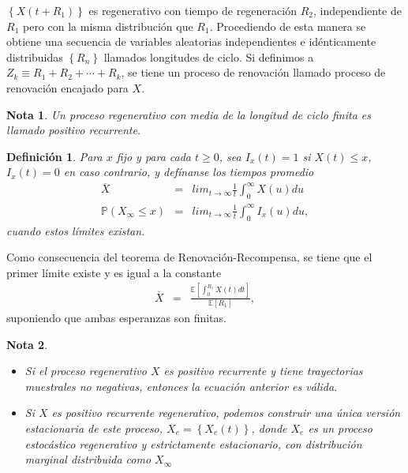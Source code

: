 \documentclass{article}
\newtheorem{Def}{Definición}
\newtheorem{Note}{Nota}
\newcommand{\esp}{\mathbb{E}}
\newcommand{\prob}{\mathbb{P}}
\begin{document}
$\left\{X\left(t+R_{1}\right)\right\}$ es regenerativo con tiempo de regeneraci\'on $R_{2}$, independiente de $R_{1}$ pero con la misma distribuci\'on que $R_{1}$. Procediendo de esta manera se obtiene una secuencia de variables aleatorias independientes e id\'enticamente distribuidas $\left\{R_{n}\right\}$ llamados longitudes de ciclo. Si definimos a $Z_{k}\equiv R_{1}+R_{2}+\cdots+R_{k}$, se tiene un proceso de renovaci\'on llamado proceso de renovaci\'on encajado para $X$.

\begin{Note}
Un proceso regenerativo con media de la longitud de ciclo finita es llamado positivo recurrente.
\end{Note}


\begin{Def}
Para $x$ fijo y para cada $t\geq0$, sea $I_{x}\left(t\right)=1$ si $X\left(t\right)\leq x$,  $I_{x}\left(t\right)=0$ en caso contrario, y def\'inanse los tiempos promedio
\begin{eqnarray*}
\overline{X}&=&lim_{t\rightarrow\infty}\frac{1}{t}\int_{0}^{\infty}X\left(u\right)du\\
\prob\left(X_{\infty}\leq x\right)&=&lim_{t\rightarrow\infty}\frac{1}{t}\int_{0}^{\infty}I_{x}\left(u\right)du,
\end{eqnarray*}
cuando estos l\'imites existan.
\end{Def}

Como consecuencia del teorema de Renovaci\'on-Recompensa, se tiene que el primer l\'imite  existe y es igual a la constante
\begin{eqnarray*}
\overline{X}&=&\frac{\esp\left[\int_{0}^{R_{1}}X\left(t\right)dt\right]}{\esp\left[R_{1}\right]},
\end{eqnarray*}
suponiendo que ambas esperanzas son finitas.

\begin{Note}
\begin{itemize}
\item[a)] Si el proceso regenerativo $X$ es positivo recurrente y tiene trayectorias muestrales no negativas, entonces la ecuaci\'on anterior es v\'alida.
\item[b)] Si $X$ es positivo recurrente regenerativo, podemos construir una \'unica versi\'on estacionaria de este proceso, $X_{e}=\left\{X_{e}\left(t\right)\right\}$, donde $X_{e}$ es un proceso estoc\'astico regenerativo y estrictamente estacionario, con distribuci\'on marginal distribuida como $X_{\infty}$
\end{itemize}
\end{Note}
\end{document}
